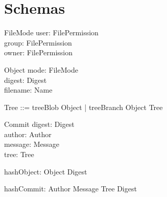 \section{Schemas}

\begin{schema}{FileMode}
  user: FilePermission \\
  group: FilePermission \\
  owner: FilePermission
\end{schema}

\begin{schema}{Object}
  mode: FileMode \\
	digest: Digest \\
	filename: Name
\end{schema}

\begin{zed}
  Tree ::= treeBlob \ldata Object \rdata | treeBranch \ldata Object \cross \finset Tree \rdata
\end{zed}


\begin{schema}{Commit}
	digest: Digest \\
	author: Author \\
	message: Message \\
	tree: Tree
\end{schema}

\begin{axdef}
  hashObject: Object \surj Digest
\end{axdef}

\begin{axdef}
  hashCommit: Author \cross Message \cross Tree \surj Digest
\end{axdef}
